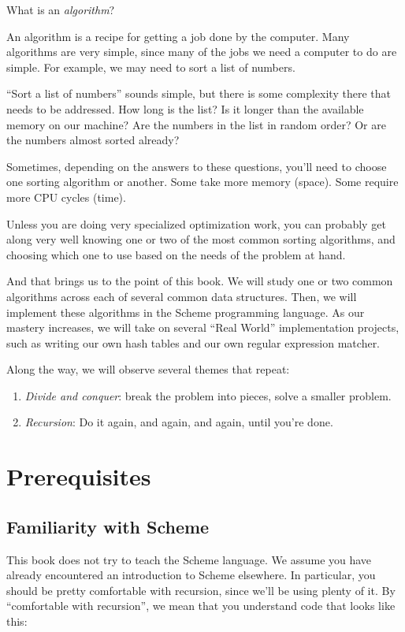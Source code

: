 \documentclass[12pt,openright,draft]{book}
\begin{document}
What is an \emph{algorithm}?

An algorithm is a recipe for getting a job done by the computer.
Many algorithms are very simple, since many of the jobs we need a
computer to do are simple.  For example, we may need to sort a list
of numbers.

``Sort a list of numbers'' sounds simple, but there is some complexity
there that needs to be addressed.  How long is the list?  Is it
longer than the available memory on our machine?  Are the numbers in
the list in random order?  Or are the numbers almost sorted already?

Sometimes, depending on the answers to these questions, you'll need
to choose one sorting algorithm or another.  Some take more memory
(space).  Some require more CPU cycles (time).

Unless you are doing very specialized optimization work, you can
probably get along very well knowing one or two of the most common
sorting algorithms, and choosing which one to use based on the needs
of the problem at hand.

And that brings us to the point of this book.  We will study one or
two common algorithms across each of several common data structures.
Then, we will implement these algorithms in the Scheme programming
language.  As our mastery increases, we will take on several ``Real
World'' implementation projects, such as writing our own hash tables
and our own regular expression matcher.

Along the way, we will observe several themes that repeat:

\begin{enumerate}
\item \emph{Divide and conquer}: break the problem into pieces, solve a smaller problem.
\item \emph{Recursion}: Do it again, and again, and again, until you're done.
\end{enumerate}

\chapter{Prerequisites}

\section{Familiarity with Scheme}

This book does not try to teach the Scheme language.  We assume you
have already encountered an introduction to Scheme elsewhere. In
particular, you should be pretty comfortable with recursion, since
we'll be using plenty of it.  By ``comfortable with recursion'', we mean
that you understand code that looks like this:
\end{document}
